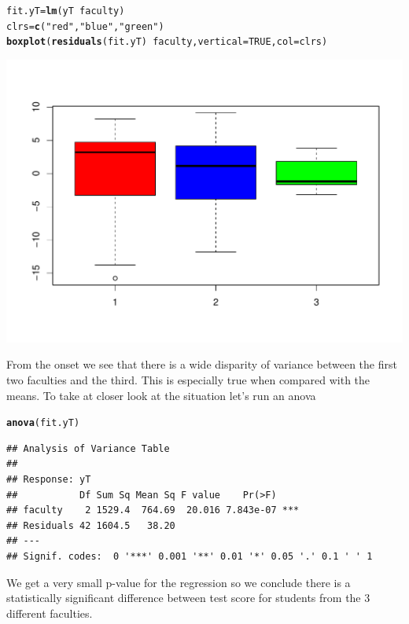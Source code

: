 \documentclass{article}\usepackage[]{graphicx}\usepackage[]{color}
\makeatletter
\def\maxwidth{ %
  \ifdim\Gin@nat@width>\linewidth
    \linewidth
  \else
    \Gin@nat@width
  \fi
}
\newcommand{\hlnum}[1]{\textcolor[rgb]{0.686,0.059,0.569}{#1}}%
\newcommand{\hlstr}[1]{\textcolor[rgb]{0.192,0.494,0.8}{#1}}%
\newcommand{\hlopt}[1]{\textcolor[rgb]{0,0,0}{#1}}%
\newcommand{\hlstd}[1]{\textcolor[rgb]{0.345,0.345,0.345}{#1}}%
\newcommand{\hlkwb}[1]{\textcolor[rgb]{0.69,0.353,0.396}{#1}}%
\newcommand{\hlkwc}[1]{\textcolor[rgb]{0.333,0.667,0.333}{#1}}%
\newcommand{\hlkwd}[1]{\textcolor[rgb]{0.737,0.353,0.396}{\textbf{#1}}}%
\newenvironment{kframe}{%
 \def\at@end@of@kframe{}%
 \ifinner\ifhmode%
  \def\at@end@of@kframe{\end{minipage}}%
  \begin{minipage}{\columnwidth}%
 \fi\fi%
 \def\FrameCommand##1{\hskip\@totalleftmargin \hskip-\fboxsep
 \colorbox{shadecolor}{##1}\hskip-\fboxsep
     \hskip-\linewidth \hskip-\@totalleftmargin \hskip\columnwidth}%
 \MakeFramed {\advance\hsize-\width
   \@totalleftmargin\z@ \linewidth\hsize
   \@setminipage}}%
 {\par\unskip\endMakeFramed%
 \at@end@of@kframe}
\newenvironment{knitrout}{}{} %
\makeatother
\begin{document}
\begin{knitrout}
\color{fgcolor}\begin{kframe}
\begin{alltt}
\hlstd{fit.yT} \hlkwb{=} \hlkwd{lm}\hlstd{(yT} \hlopt{~} \hlstd{faculty)}
\hlstd{clrs} \hlkwb{=} \hlkwd{c}\hlstd{(}\hlstr{"red"}\hlstd{,} \hlstr{"blue"}\hlstd{,} \hlstr{"green"}\hlstd{)}
\hlkwd{boxplot}\hlstd{(}\hlkwd{residuals}\hlstd{(fit.yT)} \hlopt{~} \hlstd{faculty,} \hlkwc{vertical} \hlstd{=} \hlnum{TRUE}\hlstd{,} \hlkwc{col} \hlstd{= clrs)}
\end{alltt}
\end{kframe}
\includegraphics[width=\maxwidth]{figure/unnamed-chunk-2-1} 

\end{knitrout}



From the onset we see that there is a wide disparity of variance between the first two faculties and the third. This is especially true when compared with the means. To take at closer look at the situation let's run an anova

\begin{knitrout}
\color{fgcolor}\begin{kframe}
\begin{alltt}
\hlkwd{anova}\hlstd{(fit.yT)}
\end{alltt}
\begin{verbatim}
## Analysis of Variance Table
## 
## Response: yT
##           Df Sum Sq Mean Sq F value    Pr(>F)    
## faculty    2 1529.4  764.69  20.016 7.843e-07 ***
## Residuals 42 1604.5   38.20                      
## ---
## Signif. codes:  0 '***' 0.001 '**' 0.01 '*' 0.05 '.' 0.1 ' ' 1
\end{verbatim}
\end{kframe}
\end{knitrout}
We get a very small p-value for the regression so we conclude there is a statistically significant difference between test score for students from the 3 different faculties. 
\end{document}
